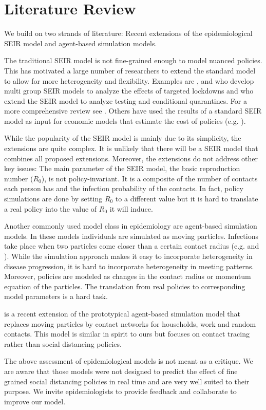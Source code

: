 \section{Literature Review}
\label{sec:literature_review}

We build on two strands of literature: Recent extensions of the epidemiological SEIR model and agent-based simulation models.

The traditional SEIR model is not fine-grained enough to model nuanced policies. This has motivated a large number of researchers to extend the standard model to allow for more heterogeneity and flexibility. Examples are \cite{Grimm2020}, \cite{Donsimoni2020} and \cite{Acemoglu2020} who develop multi group SEIR models to analyze the effects of targeted lockdowns and \cite{Berger2020} who extend the SEIR model to analyze testing and conditional quarantines. For a more comprehensive review see \cite{Avery2020}. Others have used the results of a standard SEIR model as input for economic models that estimate the cost of policies (e.g. \cite{Dorn2020}).

While the popularity of the SEIR model is mainly due to its simplicity, the extensions are quite complex. It is unlikely that there will be a SEIR model that combines all proposed extensions. Moreover, the extensions do not address other key issues: The main parameter of the SEIR model, the basic reproduction number ($R_0$), is not policy-invariant. It is a composite of the number of contacts each person has and the infection probability of the contacts. In fact, policy simulations are done by setting $R_0$ to a different value but it is hard to translate a real policy into the value of $R_0$ it will induce.

Another commonly used model class in epidemiology are agent-based simulation models. In these models individuals are simulated as moving particles. Infections take place when two particles come closer than a certain contact radius (e.g. \cite{Silva2020} and \cite{Cuevas2020}). While the simulation approach makes it easy to incorporate heterogeneity in disease progression, it is hard to incorporate heterogeneity in meeting patterns. Moreover, policies are modeled as changes in the contact radius or momentum equation of the particles. The translation from real policies to corresponding model parameters is a hard task.

\cite{Hinch2020} is a recent extension of the prototypical agent-based simulation model that replaces moving particles by contact networks for households, work and random contacts. This model is similar in spirit to ours but focuses on contact tracing rather than social distancing policies.

The above assessment of epidemiological models is not meant as a critique. We are aware that those models were not designed to predict the effect of fine grained social distancing policies in real time and are very well suited to their purpose. We invite epidemiologists to provide feedback and collaborate to improve our model.
